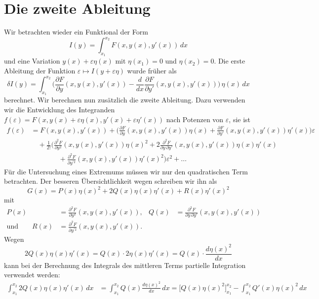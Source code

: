 %
%
%
\section{Die zweite Ableitung
\label{buch:variation2:section:zweiteableitung}}
Wir betrachten wieder ein Funktional der Form
\[
I(y)
=
\int_{x_1}^{x_2}
F(x,y(x),y'(x))
\,dx
\]
und eine Variation $y(x)+\varepsilon\eta(x)$ mit $\eta(x_1)=0$
und $\eta(x_2)=0$.
Die erste Ableitung der Funktion $\varepsilon\mapsto I(y+\varepsilon\eta)$
wurde früher als
\[
\delta I(y)
=
\int_{x_1}^{x_2}
\biggl(
\frac{\partial F}{\partial y}(x,y(x),y'(x))
-
\frac{d}{dx}
\frac{\partial F}{\partial y'}(x,y(x),y'(x))
\biggr)
\,
\eta(x)
\,dx
\]
berechnet.
Wir berechnen nun zusätzlich die zweite Ableitung.
Dazu verwenden wir die Entwicklung des Integranden
$f(\varepsilon) = F(x,y(x)+\varepsilon\eta(x),y'(x)+\varepsilon\eta'(x))$
nach Potenzen von $\varepsilon$, sie ist
\begin{align*}
f(\varepsilon)
&=
F(x,y(x),y'(x))
+
\biggl(
\frac{\partial F}{\partial y}(x,y(x),y'(x))\eta(x)
+
\frac{\partial F}{\partial y'}(x,y(x),y'(x))\eta'(x)
\biggr)
\varepsilon
\\
&\quad
+
\frac{1}{2!}
\biggl(
\frac{\partial^2 F}{\partial y^2}(x,y(x),y'(x))
\eta(x)^2
+
2
\frac{\partial^2 F}{\partial y\,\partial y'}(x,y(x),y'(x))
\eta(x)\eta'(x)
\\
&\qquad\qquad
+
\frac{\partial^2 F}{\partial y^{\prime 2}}(x,y(x),y'(x))
\eta'(x)^2
\biggr)
\varepsilon^2
+
\dots
\end{align*}
Für die Untersuchung eines Extremums müssen wir nur den quadratischen
Term betrachten.
Der besseren Übersichtlichkeit wegen schreiben wir ihn als
\[
G(x)
=
P(x)\eta(x)^2 + 2Q(x) \eta(x)\eta'(x) + R(x)\eta'(x)^2
\]
mit
\begin{align*}
P(x) &= \frac{\partial^2 F}{\partial y^2} (x,y(x),y'(x)),
&
Q(x) &= \frac{\partial^2 F}{\partial y\,\partial y'} (x,y(x),y'(x))
\\
\text{und}
\qquad
R(x) &= \frac{\partial^2 F}{\partial y^{\prime 2}} (x,y(x),y'(x)).
\end{align*}
Wegen
\[
2Q(x)\eta(x)\eta'(x)
=
Q(x)\cdot 2\eta(x)\eta'(x)
=
Q(x)\cdot \frac{d\eta(x)^2}{dx}
\]
kann bei der Berechnung des Integrals des mittleren Terms partielle
Integration verwendet werden:
\begin{align*}
\int_{x_1}^{x_2}
2Q(x)\eta(x)\eta'(x)
\,dx
&=
\int_{x_1}^{x_2}
Q(x) \frac{d\eta(x)^2}{dx}
\,dx
=
\biggl[Q(x)\eta(x)^2\biggr]_{x_1}^{x_2}
-
\int_{x_1}^{x_2} Q'(x) \eta(x)^2\,dx
\end{align*}
